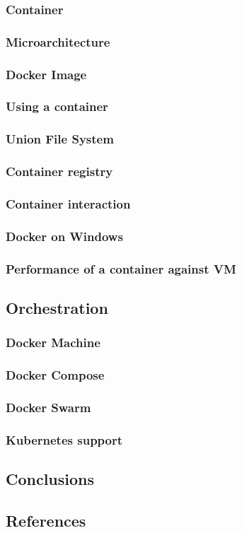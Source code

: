 \subsubsection{Container}
\subsubsection{Microarchitecture}
\subsubsection{Docker Image}
\subsubsection{Using a container}
\subsubsection{Union File System}
\subsubsection{Container registry}
\subsubsection{Container interaction}
\subsubsection{Docker on Windows}
\subsubsection{Performance of a container against VM}
\subsection{Orchestration}
\subsubsection{Docker Machine}
\subsubsection{Docker Compose}
\subsubsection{Docker Swarm}
\subsubsection{Kubernetes support}
\subsection{Conclusions}
\subsection{References}
